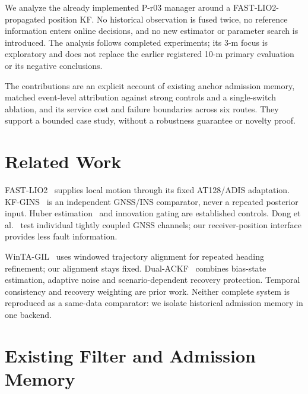 \documentclass[conference]{IEEEtran}
\begin{document}
We analyze the already implemented P-r03 manager around a FAST-LIO2-propagated position KF. No historical observation is fused twice, no reference information enters online decisions, and no new estimator or parameter search is introduced. The analysis follows completed experiments; its 3-m focus is exploratory and does not replace the earlier registered 10-m primary evaluation or its negative conclusions.

The contributions are an explicit account of existing anchor admission memory, matched event-level attribution against strong controls and a single-switch ablation, and its service cost and failure boundaries across six routes. They support a bounded case study, without a robustness guarantee or novelty proof.

\section{Related Work}
FAST-LIO2~\cite{fastlio2} supplies local motion through its fixed AT128/ADIS adaptation. KF-GINS~\cite{kfgins} is an independent GNSS/INS comparator, never a repeated posterior input. Huber estimation~\cite{huber} and innovation gating are established controls. Dong et al.~\cite{dong2020} test individual tightly coupled GNSS channels; our receiver-position interface provides less fault information.

WinTA-GIL~\cite{winta} uses windowed trajectory alignment for repeated heading refinement; our alignment stays fixed. Dual-ACKF~\cite{dual} combines bias-state estimation, adaptive noise and scenario-dependent recovery protection. Temporal consistency and recovery weighting are prior work. Neither complete system is reproduced as a same-data comparator: we isolate historical admission memory in one backend.

\section{Existing Filter and Admission Memory}
\end{document}
